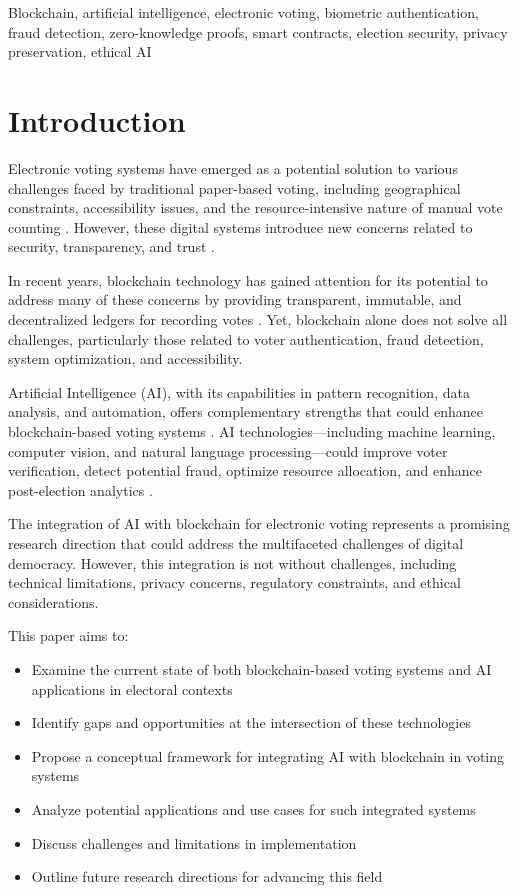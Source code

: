 \documentclass[conference]{IEEEtran}
\begin{document}
\begin{IEEEkeywords}
Blockchain, artificial intelligence, electronic voting, biometric authentication, fraud detection, zero-knowledge proofs, smart contracts, election security, privacy preservation, ethical AI
\end{IEEEkeywords}

\section{Introduction}
Electronic voting systems have emerged as a potential solution to various challenges faced by traditional paper-based voting, including geographical constraints, accessibility issues, and the resource-intensive nature of manual vote counting \cite{b1}. However, these digital systems introduce new concerns related to security, transparency, and trust \cite{b2}. 

In recent years, blockchain technology has gained attention for its potential to address many of these concerns by providing transparent, immutable, and decentralized ledgers for recording votes \cite{b3}. Yet, blockchain alone does not solve all challenges, particularly those related to voter authentication, fraud detection, system optimization, and accessibility. 

Artificial Intelligence (AI), with its capabilities in pattern recognition, data analysis, and automation, offers complementary strengths that could enhance blockchain-based voting systems \cite{b4}. AI technologies—including machine learning, computer vision, and natural language processing—could improve voter verification, detect potential fraud, optimize resource allocation, and enhance post-election analytics \cite{b5}.

The integration of AI with blockchain for electronic voting represents a promising research direction that could address the multifaceted challenges of digital democracy. However, this integration is not without challenges, including technical limitations, privacy concerns, regulatory constraints, and ethical considerations.

This paper aims to:
\begin{itemize}
    \item Examine the current state of both blockchain-based voting systems and AI applications in electoral contexts
    \item Identify gaps and opportunities at the intersection of these technologies
    \item Propose a conceptual framework for integrating AI with blockchain in voting systems
    \item Analyze potential applications and use cases for such integrated systems
    \item Discuss challenges and limitations in implementation
    \item Outline future research directions for advancing this field
\end{itemize}
\end{document}
